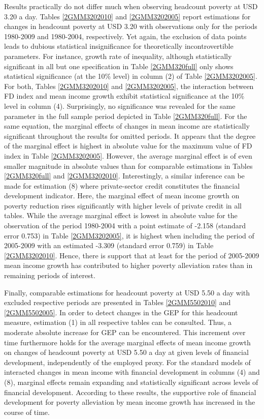 \documentclass[12pt, a4paper]{article}
\begin{document}
Results practically do not differ much when observing headcount poverty at USD 3.20 a day. Tables \ref{2GMM3202010} and \ref{2GMM3202005} report estimations for changes in headcount poverty at USD 3.20 with observations only for the periods 1980-2009 and 1980-2004, respectively. Yet again, the exclusion of data points leads to dubious statistical insignificance for theoretically incontrovertible parameters. For instance, growth rate of inequality, although statistically significant in all but one specification in Table \ref{2GMM320full} only shows statistical significance (at the 10\% level) in column (2) of Table \ref{2GMM3202005}. For both, Tables \ref{2GMM3202010} and \ref{2GMM3202005}, the interaction between FD index and mean income growth exhibit statistical significance at the 10\% level in column (4). Surprisingly, no significance was revealed for the same parameter in the full sample period depicted in Table \ref{2GMM320full}. For the same equation, the marginal effects of changes in mean income are statistically significant throughout the results for omitted periods. It appears that the degree of the marginal effect is highest in absolute value for the maximum value of FD index in Table \ref{2GMM3202005}. However, the average marginal effect is of even smaller magnitude in absolute values than for comparable estimations in Tables \ref{2GMM320full} and \ref{2GMM3202010}. Interestingly, a similar inference can be made for estimation (8) where private-sector credit constitutes the financial development indicator. Here, the marginal effect of mean income growth on poverty reduction rises significantly with higher levels of private credit in all tables. While the average marginal effect is lowest in absolute value for the observation of the period 1980-2004 with a point estimate of -2.158 (standard error 0.753) in Table \ref{2GMM3202005}, it is highest when including the period of 2005-2009 with an estimated -3.309 (standard error 0.759) in Table \ref{2GMM3202010}. Hence, there is support that at least for the period of 2005-2009 mean income growth has contributed to higher poverty alleviation rates than in remaining periods of interest.

Finally, comparable estimations for headcount poverty at USD 5.50 a day with excluded respective periods are presented in Tables \ref{2GMM5502010} and \ref{2GMM5502005}. In order to detect changes in the GEP for this headcount measure, estimation (1) in all respective tables can be consulted. Thus, a moderate absolute increase for GEP can be encountered. This increment over time furthermore holds for the average marginal effects of mean income growth on changes of headcount poverty at USD 5.50 a day at given levels of financial development, independently of the employed proxy. For the standard models of interacted changes in mean income with financial development in columns (4) and (8), marginal effects remain expanding and statistically significant across levels of financial development. According to these results, the supportive role of financial development for poverty alleviation by mean income growth has increased in the course of time.
\end{document}

